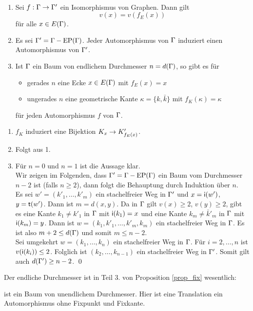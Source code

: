 \PROP\
\label{prop_fix}
\begin{enumerate}
\item Sei $f:\Gamma\rightarrow\Gamma'$ ein Isomorphismus von Graphen.
Dann gilt
\[
v(x) = v(f_E(x))
\]
für alle $x\in E(\Gamma)$.
\item Es sei $\Gamma'=\Gamma-\mathrm{EP}(\Gamma)$. Jeder Automorphismus von $\Gamma$
induziert einen Automorphismus von $\Gamma'$.
\item Ist $\Gamma$ ein Baum von endlichem Durchmesser $n=d(\Gamma)$,
so gibt es für
	\begin{itemize}
	\item gerades $n$ eine Ecke $x\in E(\Gamma)$ mit $f_E(x)=x$
	\item ungerades $n$ eine geometrische Kante $\kappa=\{k,\bar{k}\}$
	mit $f_K(\kappa)=\kappa$
	\end{itemize}
für jeden Automorphismus $f$ von $\Gamma$.
\end{enumerate}
\bew 
\begin{enumerate}
\item $f_K$ induziert eine Bijektion $K_x\rightarrow K'_{f_E(x)}$.
\item Folgt aus 1.
\item Für $n=0$ und $n=1$ ist die Aussage klar.\\
Wir zeigen im Folgenden, dass $\Gamma'=\Gamma-\mathrm{EP}(\Gamma)$ ein Baum vom
Durchmesser $n-2$ ist (falls $n\geq 2$), dann folgt die
Behauptung durch Induktion über $n$.\\
Es sei $w'=(k'_1,\ldots,k'_m)$ ein stachelfreier Weg in $\Gamma'$
und $x=\mathsf{i}(w')$, $y=\mathsf{t}(w')$. Dann ist $m=d(x,y)$.
Da in $\Gamma$ gilt $v(x)\geq 2$, $v(y)\geq 2$, gibt es eine Kante
$k_1\neq k'_1$ in $\Gamma$ mit $\mathsf{i}(k_1)=x$ und eine Kante
$k_m\neq \bar{k}'_m$ in $\Gamma$ mit $\mathsf{i}(k_m)=y$.
Dann ist $w=(k_1,k'_1,\ldots,k'_m,k_m)$ ein stachelfreier Weg
in $\Gamma$. Es ist also $m+2\leq d(\Gamma)$ und somit $m\leq n-2$.\\
Sei umgekehrt $w=(k_1,\ldots,k_n)$ ein stachelfreier Weg in $\Gamma$.
Für $i=2,\ldots,n$ ist $v(\mathsf{i}(k_i))\leq 2$. Folglich ist
$(k_2,\ldots,k_{n-1})$ ein stachelfreier Weg in $\Gamma'$.
Somit gilt auch $d(\Gamma')\geq n-2$.
\qed
\end{enumerate}

\BSP Der endliche Durchmesser ist in Teil 3. von Proposition
\ref{prop_fix} wesentlich:
\begin{center}
\end{center}
ist ein Baum von unendlichem Durchmesser. Hier ist eine Translation
ein Automorphismus ohne Fixpunkt und Fixkante.


